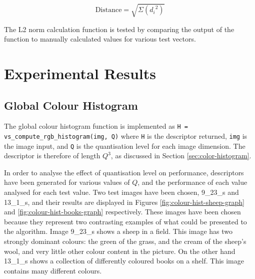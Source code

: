\begin{equation}
	\text{Distance} = \sqrt{ \Sigma{ ({d_i}^2)} }
	\label{eq:l2-norm}
\end{equation}

The L2 norm calculation function is tested by comparing the output of the function to manually calculated values for various test vectors.

\chapter{Experimental Results} \label{sec:results}

\section{Global Colour Histogram} \label{sec:global-colour-histogram-results}
The global colour histogram function is implemented as \texttt{H =  vs\_compute\_rgb\_histogram(img, Q)} where \texttt{H} is the descriptor returned, \texttt{img} is the image input, and \texttt{Q} is the quantisation level for each image dimension. The descriptor is therefore of length $Q^3$, as discussed in Section \ref{sec:color-histogram}.

In order to analyse the effect of quantisation level on performance, descriptors have been generated for various values of $Q$, and the performance of each value analysed for each test value. Two test images have been chosen, 9\_23\_s and 13\_1\_s, and their results are displayed in Figures \ref{fig:colour-hist-sheep-graph} and \ref{fig:colour-hist-books-graph} respectively. These images have been chosen because they represent two contrasting examples of what could be presented to the algorithm. Image 9\_23\_s shows a sheep in a field. This image has two strongly dominant colours: the green of the grass, and the cream of the sheep's wool, and very little other colour content in the picture. On the other hand 13\_1\_s shows a collection of differently coloured books on a shelf. This image contains many different colours.


